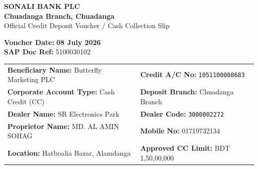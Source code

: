 \documentclass[11pt, a4paper]{article}
\begin{document}
\begin{tcolorbox}[colback=darknavy, colframe=darknavy, arc=4pt, left=12pt, right=12pt, top=10pt, bottom=10pt]
  \begin{minipage}{0.65\textwidth}
    {\color{white}\fontsize{18pt}{22pt}\selectfont \textbf{SONALI BANK PLC}} \\[3pt]
    {\color{goldaccent}\fontsize{11pt}{14pt}\selectfont \textbf{Chuadanga Branch, Chuadanga}} \\[2pt]
    {\color{white}\small Official Credit Deposit Voucher / Cash Collection Slip}
  \end{minipage} %
  \begin{minipage}{0.34\textwidth}
    \raggedleft
    {\color{white}\small \textbf{Voucher Date:}} {\color{goldaccent}\small \textbf{08 July 2026}} \\[3pt]
    {\color{white}\small \textbf{SAP Doc Ref:}} {\color{white}\small 5100030102} \\[3pt]
  \end{minipage}
\end{tcolorbox}

\vspace{-4pt}

\begin{tcolorbox}[colback=lightgrey, colframe=bordergrey, title=\textbf{\color{darknavy}{1. BENEFICIARY \& DEALER ACCOUNT DETAILS}}, fonttitle=\bfseries, arc=3pt, left=8pt, right=8pt, top=6pt, bottom=6pt]
  \renewcommand{\arraystretch}{1.3}
  \begin{tabularx}{\textwidth}{@{} X X @{}}
    \textbf{Beneficiary Name:} Butterfly Marketing PLC & \textbf{Credit A/C No:} \texttt{1051100008683} \\
    \textbf{Corporate Account Type:} Cash Credit (CC) & \textbf{Deposit Branch:} Chuadanga Branch \\
    \hline
    \textbf{Dealer Name:} SR Electronics Park & \textbf{Dealer Code:} \texttt{3000002272} \\
    \textbf{Proprietor Name:} MD. AL AMIN SOHAG & \textbf{Mobile No:} 01719732134 \\
    \textbf{Location:} Hatboalia Bazar, Alamdanga & \textbf{Approved CC Limit:} BDT 1,50,00,000 \\
  \end{tabularx}
\end{tcolorbox}
\end{document}
